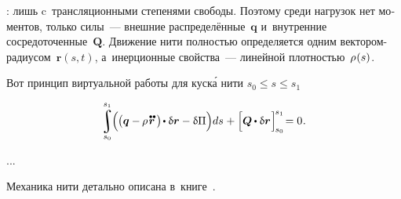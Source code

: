 

\begin{otherlanguage}{russian}

 :
   лишь c~трансляционными степенями свободы.
Поэтому среди нагрузок нет моментов, только  силы~--- внешние распределённые~$\bm{q}$ и~внутренние сосредоточенные~$\bm{Q}$.
Движение нити полностью определяется одним вектором-радиусом~${\bm{r}(s,t)}$, а~инерционные свойства~--- линейной плотностью~${\rho\hspace{.12ex}(s)}$.

Вот принцип виртуальной работы для куск\'{а} нити ${s_0 \leq s \leq s_1}$

\nopagebreak\vspace{-0.25em}\begin{equation}
\scalebox{0.95}{$
\displaystyle \integral\displaylimits_{\raisemath{.05em}{\mathclap{s_0}}}^{\raisemath{.15em}{\mathclap{s_1}}}
$}
\hspace{-0.25ex} \Bigl( \hspace{-0.1ex}
\bigl( \bm{q} - \hspace{-0.12ex} \rho \hspace{.2ex} \mathdotdotabove{\bm{r}} \hspace{.36ex} \bigr)
\hspace{-0.25ex} \dotp \variation{\bm{r}}
- \variation{\Pi}
\Bigr) ds
\hspace{.1ex} + \Bigl[
\bm{Q} \hspace{-0.1ex} \dotp \variation{\bm{r}}
\hspace{.12ex} \Bigr]_{\hspace{-0.25ex}s_0}^{\hspace{-0.25ex}s_1}
\hspace{-0.4ex} = 0 \hspace{.1ex} .
\end{equation}

...


Механика нити детально описана в~книге~\cite{merkin-threadmechanics}.

\end{otherlanguage}


